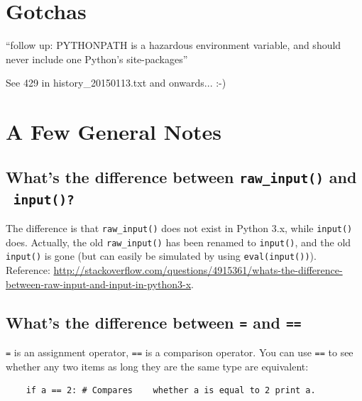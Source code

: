 \documentclass[11pt,a4paper]{article}
\begin{document}
\newpage
\section{Gotchas}
``follow up: PYTHONPATH is a hazardous environment variable, and should never include one Python's site-packages'' 

See 429 in history\_20150113.txt and onwards... :-) 




\newpage
\section{A Few General Notes}
    \subsection{What's the difference between {\tt raw\_input()} and {\tt\ input()?}}
    The difference is that {\tt raw\_input()} does not exist in Python 3.x,
    while {\tt input()} does. Actually, the old {\tt raw\_input()} has been renamed to
     {\tt input()}, and the old  {\tt input()} is gone (but can easily be simulated by
    using  {\tt eval(input())}).
    Reference: \href{http://stackoverflow.com/questions/4915361/whats-the-difference-between-raw-input-and-input-in-python3-x}{http://stackoverflow.com/questions/4915361/whats-the-difference-between-raw-input-and-input-in-python3-x}. 
   

    \subsection{What's the difference between {\tt =} and {\tt ==}}
    {\tt =} is an assignment operator, {\tt ==} is a comparison operator.
    You can use {\tt ==} to see whether any two items as
    long they are the same type are equivalent:
    \begin{lstlisting}
    if a == 2: # Compares    whether a is equal to 2 print a.
    \end{lstlisting}
\end{document}
